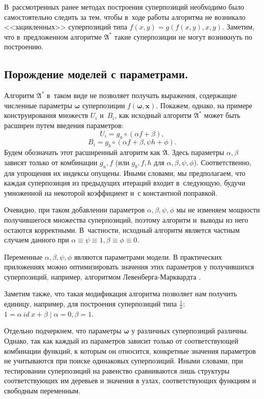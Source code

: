 \documentclass[12pt,a4paper]{article}
\begin{document}
В~рассмотренных ранее методах построения суперпозиций \cite{Zelinka2008}
необходимо было самостоятельно следить за тем, чтобы в~ходе работы алгоритма
не возникало <<зацикленных>> суперпозиций типа $f(x, y) = g (f(x, y), x, y)$.
Заметим, что в~предложенном алгоритме $\mathfrak{A^*}$ такие суперпозиции
не могут возникнуть по построению.

\subsection{Порождение моделей с параметрами.}
Алгоритм $\mathfrak{A^*}$ в~таком виде не позволяет получать выражения, содержащие численные
параметры $\boldsymbol{\omega}$ суперпозиции $f(\boldsymbol{\omega}, \mathbf{x})$.
Покажем, однако, на примере конструирования множеств $U_i$ и~$B_i$, как
исходный алгоритм $\mathfrak{A^*}$ может быть расширен путем введения параметров:
\[
U_i = { g_u \circ (\alpha f + \beta) },
\]
\[
B_i = { g_b \circ (\alpha f + \beta, \psi h + \phi) }.
\]
Будем обозначать этот расширенный алгоритм как $\mathfrak{A}$. Здесь параметры
$\alpha, \beta$ зависят только от комбинации $g_u, f$ (или $g_b, f, h$ для
$\alpha, \beta, \psi, \phi$). Соответственно, для упрощения их индексы опущены.
Иными словами, мы предполагаем, что каждая суперпозиция из предыдущих итераций
входит в~следующую, будучи умноженной на некоторой коэффициент и~с константной
поправкой.

Очевидно, при таком добавлении параметров $\alpha, \beta, \psi, \phi$
мы не изменяем мощности получившегося множества суперпозиций, поэтому
алгоритм и~выводы из него остаются корректными. В~частности, исходный алгоритм
является частным случаем данного при
$\alpha \equiv \psi \equiv 1, \beta \equiv \phi \equiv 0$.

Переменные $\alpha, \beta, \psi, \phi$ являются параметрами модели. В
практических приложениях можно оптимизировать значения этих параметров у
получившихся суперпозиций, например, алгоритмом Левенберга-Марквардта
\cite{Marquardt1963Algorithm, more:78}.

Заметим также, что такая модификация алгоритма позволяет нам получить единицу,
например, для построения суперпозиций типа $\frac{1}{x}$:
$1 = \alpha\ id\ x + \beta \mid \alpha = 0, \beta = 1$.

Отдельно подчеркнем, что параметры $\boldsymbol{\omega}$ у различных
суперпозиций различны. Однако, так как каждый из параметров зависит только
от соответствующей комбинации функций, к которым он относится, конкретные
значения параметров не учитываются при поиске одинаковых суперпозиций.
Иными словами, при тестировании суперпозиций на равенство сравниваются лишь
структуры соответствующих им деревьев и значения в узлах, соответствующих
функциям и свободным переменным.
\end{document}
